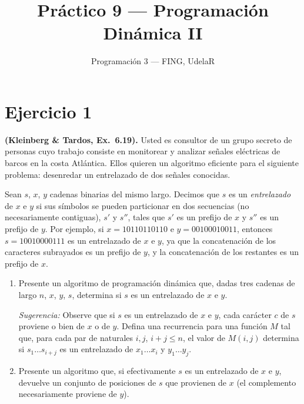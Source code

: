 

\newcommand{\OPT}{\mathrm{OPT}}
\newcommand{\True}{\textsc{verdadero}}
\newcommand{\False}{\textsc{falso}}

\title{Práctico 9 --- Programación Dinámica II}
\author{Programación 3 --- FING, UdelaR}
\date{}


\maketitle

\section{Ejercicio 1}

\begin{enunciado}
\textbf{(Kleinberg \& Tardos, Ex.~6.19).} Usted es consultor de un grupo secreto de personas cuyo trabajo
consiste en monitorear y analizar señales eléctricas de barcos en la costa Atlántica. Ellos quieren un
algoritmo eficiente para el siguiente problema: desenredar un entrelazado de dos señales conocidas.

Sean $s$, $x$, $y$ cadenas binarias del mismo largo. Decimos que $s$ es un \emph{entrelazado} de $x$ e $y$
si sus símbolos se pueden particionar en dos secuencias (no necesariamente contiguas), $s'$ y $s''$, tales
que $s'$ es un prefijo de $x$ y $s''$ es un prefijo de $y$. Por ejemplo, si $x = 10110110110$ e
$y = 00100010011$, entonces $s = 10010000111$ es un entrelazado de $x$ e $y$, ya que la concatenación de los
caracteres subrayados es un prefijo de $y$, y la concatenación de los restantes es un prefijo de $x$.

\begin{enumerate}[label=(\alph*)]
\item Presente un algoritmo de programación dinámica que, dadas tres cadenas de largo $n$, $x$, $y$, $s$,
  determina si $s$ es un entrelazado de $x$ e $y$.

  \emph{Sugerencia:} Observe que si $s$ es un entrelazado de $x$ e $y$, cada carácter $c$ de $s$ proviene o
  bien de $x$ o de $y$. Defina una recurrencia para una función $M$ tal que, para cada par de naturales
  $i, j$, $i + j \le n$, el valor de $M(i, j)$ determina si $s_1 \dots s_{i+j}$ es un entrelazado de
  $x_1 \dots x_i$ y $y_1 \dots y_j$.
\item Presente un algoritmo que, si efectivamente $s$ es un entrelazado de $x$ e $y$, devuelve un conjunto
  de posiciones de $s$ que provienen de $x$ (el complemento necesariamente proviene de $y$).
\end{enumerate}
\end{enunciado}

